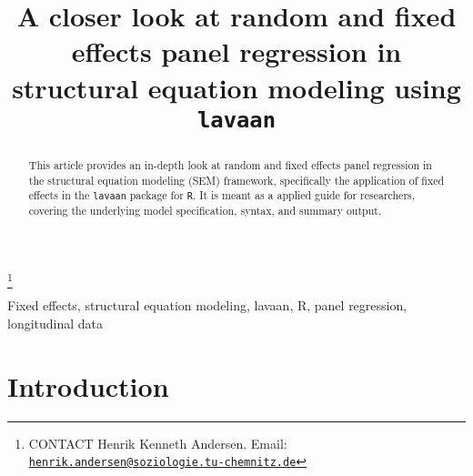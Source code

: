 \documentclass[]{interact}
\theoremstyle{plain}%
\theoremstyle{definition}
\theoremstyle{remark}
\begin{document}

\title{A closer look at random and fixed effects panel regression in
structural equation modeling using \texttt{lavaan}}


\author{
}

\thanks{CONTACT Henrik Kenneth
Andersen. Email: \href{mailto:henrik.andersen@soziologie.tu-chemnitz.de}{\nolinkurl{henrik.andersen@soziologie.tu-chemnitz.de}}}

\maketitle

\begin{abstract}
This article provides an in-depth look at random and fixed effects panel
regression in the structural equation modeling (SEM) framework,
specifically the application of fixed effects in the \texttt{lavaan}
package for \texttt{R}. It is meant as a applied guide for researchers,
covering the underlying model specification, syntax, and summary output.
\end{abstract}

\begin{keywords}
Fixed effects, structural equation modeling, lavaan, R, panel
regression, longitudinal data
\end{keywords}

\newpage

\setcounter{page}{1}

\doublespacing

\hypertarget{intro}{%
\section{Introduction}\label{intro}}
\end{document}
